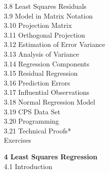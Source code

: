 3.8 Least Squares Residuals \dotfill\\
3.9 Model in Matrix Notation \dotfill\\
3.10 Projection Matrix \dotfill\\
3.11 Orthogonal Projection \dotfill\\
3.12 Estimation of Error Variance \dotfill\\
3.13 Analysis of Variance \dotfill\\
3.14 Regression Components \dotfill\\
3.15 Residual Regression \dotfill\\
3.16 Prediction Errors \dotfill\\
3.17 Influential Observations \dotfill\\
3.18 Normal Regression Model \dotfill\\
3.19 CPS Data Set \dotfill\\
3.20 Programming \dotfill\\
3.21 Technical Proofs* \dotfill\\
Exercises \dotfill

\textbf{4 Least Squares Regression}\\
4.1 Introduction
